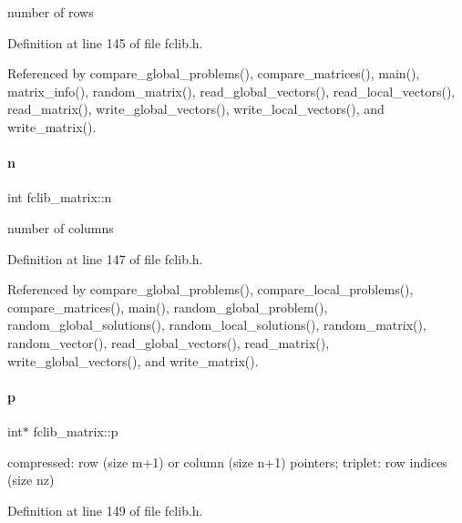 number of rows 



Definition at line 145 of file fclib.\+h.



Referenced by compare\+\_\+global\+\_\+problems(), compare\+\_\+matrices(), main(), matrix\+\_\+info(), random\+\_\+matrix(), read\+\_\+global\+\_\+vectors(), read\+\_\+local\+\_\+vectors(), read\+\_\+matrix(), write\+\_\+global\+\_\+vectors(), write\+\_\+local\+\_\+vectors(), and write\+\_\+matrix().

\mbox{\label{structfclib__matrix_ace0c395ca5da8a4bcc4958a29895c639}} 
\paragraph{\texorpdfstring{n}{n}}
{\footnotesize\ttfamily int fclib\+\_\+matrix\+::n}



number of columns 



Definition at line 147 of file fclib.\+h.



Referenced by compare\+\_\+global\+\_\+problems(), compare\+\_\+local\+\_\+problems(), compare\+\_\+matrices(), main(), random\+\_\+global\+\_\+problem(), random\+\_\+global\+\_\+solutions(), random\+\_\+local\+\_\+solutions(), random\+\_\+matrix(), random\+\_\+vector(), read\+\_\+global\+\_\+vectors(), read\+\_\+matrix(), write\+\_\+global\+\_\+vectors(), and write\+\_\+matrix().

\mbox{\label{structfclib__matrix_ace167d937e3c1bb2558e264aefada841}} 
\paragraph{\texorpdfstring{p}{p}}
{\footnotesize\ttfamily int$\ast$ fclib\+\_\+matrix\+::p}



compressed\+: row (size m+1) or column (size n+1) pointers; triplet\+: row indices (size nz) 



Definition at line 149 of file fclib.\+h.



